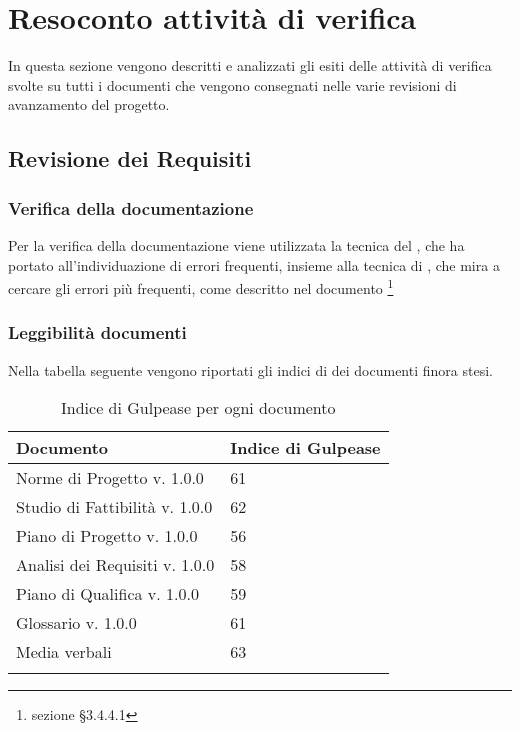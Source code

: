 \section{Resoconto attività di verifica}
In questa sezione vengono descritti e analizzati gli esiti delle attività di verifica svolte su tutti i documenti che vengono consegnati nelle varie revisioni di avanzamento del progetto.
	\subsection{Revisione dei Requisiti}
		\subsubsection{Verifica della documentazione}
		Per la verifica della documentazione viene utilizzata la tecnica del , che ha portato all'individuazione di errori frequenti, insieme alla tecnica di , che mira a cercare gli errori più frequenti, come descritto nel documento \footnote{sezione §3.4.4.1}
		\subsubsection{Leggibilità documenti}
		Nella tabella seguente vengono riportati gli indici di  dei documenti finora stesi.
		\begin{center}
			\begin{longtable}{|C{8cm}|C{4cm}|}
				\hline
				\textbf{Documento} & \textbf{Indice di Gulpease} \\ 			
				\hline
				\endhead
				
				\hline
				Norme di Progetto v. 1.0.0 & 61 \\
				\hline
				Studio di Fattibilità v. 1.0.0 & 62 \\
				\hline
				Piano di Progetto v. 1.0.0 & 56 \\
				\hline
				Analisi dei Requisiti v. 1.0.0 & 58 \\
				\hline
				Piano di Qualifica v. 1.0.0 & 59 \\
				\hline
				Glossario v. 1.0.0 & 61 \\
				\hline
				Media verbali & 63 \\
				\hline
				
				\hiderowcolors
				\caption{Indice di Gulpease per ogni documento}		
			\end{longtable}	
		\end{center}